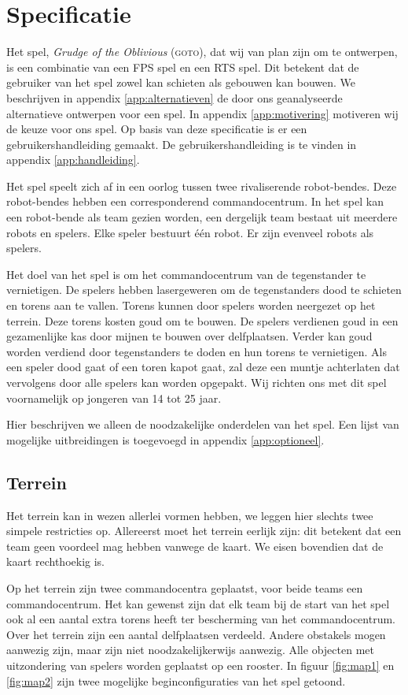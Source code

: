     \section{Specificatie}
    Het spel, \emph{Grudge of the Oblivious} (\textsc{goto}), dat wij van plan zijn om te ontwerpen, is een combinatie van een FPS spel en een RTS spel. Dit betekent dat de gebruiker van het spel zowel kan schieten als gebouwen kan bouwen. We beschrijven in appendix \ref{app:alternatieven} de door ons geanalyseerde alternatieve ontwerpen voor een spel. In appendix \ref{app:motivering} motiveren wij de keuze voor ons spel. Op basis van deze specificatie is er een gebruikershandleiding gemaakt. De gebruikershandleiding is te vinden in appendix \ref{app:handleiding}.

    Het spel speelt zich af in een oorlog tussen twee rivaliserende robot-bendes. Deze robot-bendes hebben een corresponderend commandocentrum. In het spel kan een robot-bende als team gezien worden, een dergelijk team bestaat uit meerdere robots en spelers. Elke speler bestuurt \'e\'en robot. Er zijn evenveel robots als spelers.

    Het doel van het spel is om het commandocentrum van de tegenstander te vernietigen. De spelers hebben lasergeweren om de tegenstanders dood te schieten en torens aan te vallen. Torens kunnen door spelers worden neergezet op het terrein. Deze torens kosten goud om te bouwen. De spelers verdienen goud in een gezamenlijke kas door mijnen te bouwen over delfplaatsen. Verder kan goud worden verdiend door tegenstanders te doden en hun torens te vernietigen. Als een speler dood gaat of een toren kapot gaat, zal deze een muntje achterlaten dat vervolgens door alle spelers kan worden opgepakt. Wij richten ons met dit spel voornamelijk op jongeren van 14 tot 25 jaar.

    Hier beschrijven we alleen de noodzakelijke onderdelen van het spel. Een lijst van mogelijke uitbreidingen is toegevoegd in appendix \ref{app:optioneel}.

	\subsection{Terrein}
    Het terrein kan in wezen allerlei vormen hebben, we leggen hier slechts twee simpele restricties op. Allereerst moet het terrein eerlijk zijn: dit betekent dat een team geen voordeel mag hebben vanwege de kaart. We eisen bovendien dat de kaart rechthoekig is.

    Op het terrein zijn twee commandocentra geplaatst, voor beide teams een commandocentrum. Het kan gewenst zijn dat elk team bij de start van het spel ook al een aantal extra torens heeft ter bescherming van het commandocentrum. Over het terrein zijn een aantal delfplaatsen verdeeld. Andere obstakels mogen aanwezig zijn, maar zijn niet noodzakelijkerwijs aanwezig. Alle objecten met uitzondering van spelers worden geplaatst op een rooster. In figuur \ref{fig:map1} en \ref{fig:map2} zijn twee mogelijke beginconfiguraties van het spel getoond.

